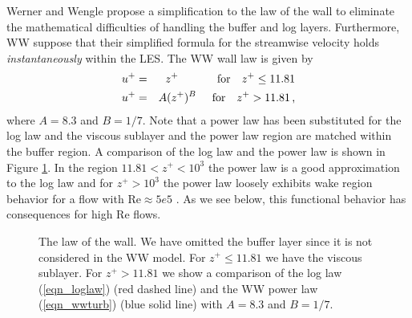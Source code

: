 Werner and Wengle \cite{Werner:1991} propose a simplification to the law of the wall to eliminate the mathematical difficulties of handling the buffer and log layers.  Furthermore, WW suppose that their simplified formula for the streamwise velocity holds \emph{instantaneously} within the LES.  The WW wall law is given by \cite{Sagaut:2001}
\begin{eqnarray}
\label{eqn_wwlam}  u^+ &=& z^+        \hspace{1.22cm}\mbox{for} \quad z^+ \le 11.81 \\
\label{eqn_wwturb} u^+ &=& A (z^+)^B  \hspace{0.50cm}\mbox{for} \quad z^+ > 11.81 \,\mbox{,}
\end{eqnarray}
where $A=8.3$ and $B=1/7$. Note that a power law has been substituted for the log law and the viscous sublayer and the power law region are matched within the buffer region.  A comparison of the log law and the power law is shown in Figure \ref{fig_lawofthewall}.  In the region $11.81 < z^+ < 10^3$ the power law is a good approximation to the log law and for $z^+>10^3$ the power law loosely exhibits wake region behavior for a flow with $\mbox{Re} \approx 5e5$ \cite{Pope:2000,Zagarola:1997}.  As we see below, this functional behavior has consequences for high Re flows.
\begin{figure}
   \begin{center}
      \caption{\label{fig_lawofthewall} \small The law of the wall.  We have omitted the buffer layer since it is not considered in the WW model.  For $z^+\le 11.81$ we have the viscous sublayer.  For $z^+>11.81$ we show a comparison of the log law (\ref{eqn_loglaw}) (red dashed line) and the WW power law (\ref{eqn_wwturb}) (blue solid line) with $A=8.3$ and $B=1/7$.}
   \end{center}
\end{figure}

